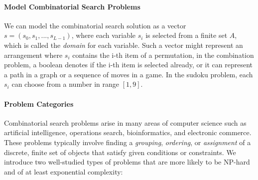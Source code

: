\documentclass[../main.tex]{subfiles}
\begin{document}
\paragraph{Model Combinatorial Search Problems} 
We can model the combinatorial search solution as a vector $s = (s_0, s_1, ..., s_{L-1})$, where each variable $s_i$ is selected from a finite  set $A$, which is called the \textit{domain} for each variable. Such a vector might represent an arrangement where $s_i$ contains the i-th item of a permutation, in the combination problem, a boolean denotes if the i-th item is selected already, or it can represent a path in a graph or a sequence of moves in a game. In the sudoku problem, each $s_i$ can choose from a number in range $[1, 9]$.


\paragraph{Problem Categories} Combinatorial search problems arise in many areas of computer science such as artificial intelligence, operations search, bioinformatics, and electronic commerce. These problems typically involve finding a \textit{grouping}, \textit{ordering}, or \textit{assignment} of a discrete, finite set of objects that satisfy given conditions or constraints.  We introduce two well-studied types of problems that are more likely to be NP-hard and of at least exponential complexity:
\end{document}
